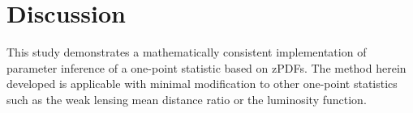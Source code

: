 \documentclass[preprint]{aastex}
\newcommand{\textul}{\underline}
\begin{document}


\section{Discussion}
\label{sec:disc}

This study demonstrates a mathematically consistent implementation of parameter inference of a one-point statistic based on zPDFs.  The method herein developed is applicable with minimal modification to other one-point statistics such as the weak lensing mean distance ratio or the luminosity function.


\end{document}
